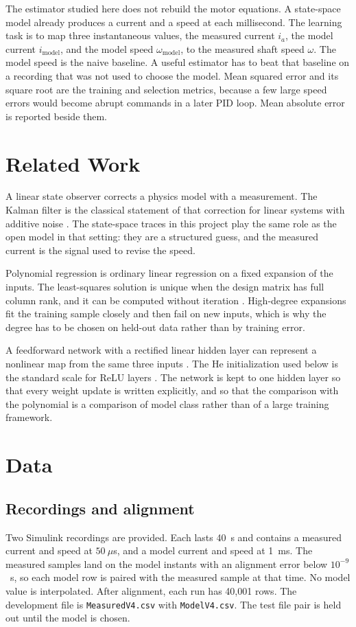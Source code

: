 \documentclass[conference]{IEEEtran}
\begin{document}
The estimator studied here does not rebuild the motor equations. A state-space model already produces a current and a speed at each millisecond. The learning task is to map three instantaneous values, the measured current $i_{a}$, the model current $i_{\mathrm{model}}$, and the model speed $\omega_{\mathrm{model}}$, to the measured shaft speed $\omega$. The model speed is the naive baseline. A useful estimator has to beat that baseline on a recording that was not used to choose the model. Mean squared error and its square root are the training and selection metrics, because a few large speed errors would become abrupt commands in a later PID loop. Mean absolute error is reported beside them.

\section{Related Work}
A linear state observer corrects a physics model with a measurement. The Kalman filter is the classical statement of that correction for linear systems with additive noise \cite{kalman1960}. The state-space traces in this project play the same role as the open model in that setting: they are a structured guess, and the measured current is the signal used to revise the speed.

Polynomial regression is ordinary linear regression on a fixed expansion of the inputs. The least-squares solution is unique when the design matrix has full column rank, and it can be computed without iteration \cite{hastie2009}. High-degree expansions fit the training sample closely and then fail on new inputs, which is why the degree has to be chosen on held-out data rather than by training error.

A feedforward network with a rectified linear hidden layer can represent a nonlinear map from the same three inputs \cite{goodfellow2016}. The He initialization used below is the standard scale for ReLU layers \cite{he2015}. The network is kept to one hidden layer so that every weight update is written explicitly, and so that the comparison with the polynomial is a comparison of model class rather than of a large training framework.

\section{Data}
\subsection{Recordings and alignment}
Two Simulink recordings are provided. Each lasts 40~s and contains a measured current and speed at $50~\mu$s, and a model current and speed at 1~ms. The measured samples land on the model instants with an alignment error below $10^{-9}$~s, so each model row is paired with the measured sample at that time. No model value is interpolated. After alignment, each run has 40{,}001 rows. The development file is \texttt{MeasuredV4.csv} with \texttt{ModelV4.csv}. The test file pair is held out until the model is chosen.
\end{document}
